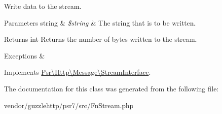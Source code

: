 Write data to the stream.


\begin{DoxyParams}[1]{Parameters}
string & {\em \$string} & The string that is to be written. \\
\hline
\end{DoxyParams}
\begin{DoxyReturn}{Returns}
int Returns the number of bytes written to the stream. 
\end{DoxyReturn}

\begin{DoxyExceptions}{Exceptions}
{\em } & \\
\hline
\end{DoxyExceptions}


Implements \hyperlink{interfacePsr_1_1Http_1_1Message_1_1StreamInterface_aabf9fe3e09f85753834cdb69bbdf3c3d}{Psr\textbackslash{}\+Http\textbackslash{}\+Message\textbackslash{}\+Stream\+Interface}.



The documentation for this class was generated from the following file\+:\begin{DoxyCompactItemize}
\item 
vendor/guzzlehttp/psr7/src/Fn\+Stream.\+php\end{DoxyCompactItemize}
